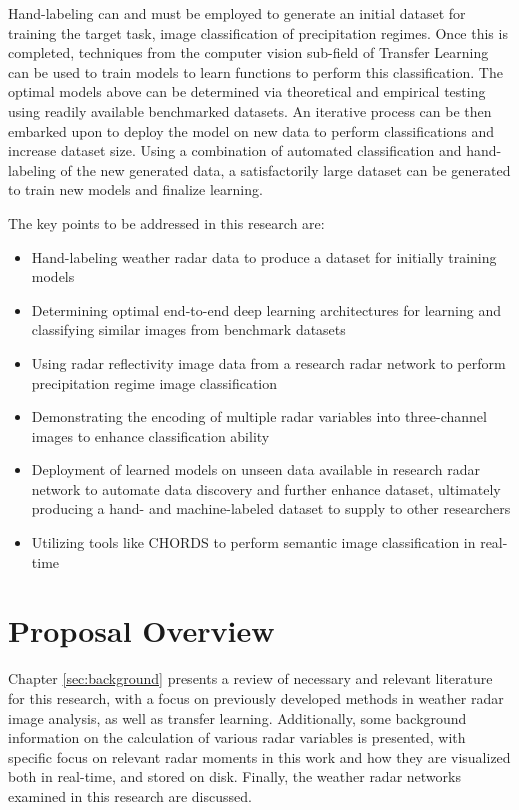 Hand-labeling can and must be employed to generate an initial dataset for training the target task, image classification of precipitation regimes.
Once this is completed, techniques from the computer vision sub-field of Transfer Learning can be used to train models to learn functions to perform this classification.
The optimal models above can be determined via theoretical and empirical testing using readily available benchmarked datasets.
An iterative process can be then embarked upon to deploy the model on new data to perform classifications and increase dataset size.
Using a combination of automated classification and hand-labeling of the new generated data, a satisfactorily large dataset can be generated to train new models and finalize learning.

The key points to be addressed in this research are:
\begin{itemize}
	\item Hand-labeling weather radar data to produce a dataset for initially training models
	\item Determining optimal end-to-end deep learning architectures for learning and classifying similar images from benchmark datasets
	\item Using radar reflectivity image data from a research radar network to perform precipitation regime image classification
	\item Demonstrating the encoding of multiple radar variables into three-channel images to enhance classification ability
	\item Deployment of learned models on unseen data available in research radar network to automate data discovery and further enhance dataset, ultimately producing a hand- and machine-labeled dataset to supply to other researchers
	\item Utilizing tools like CHORDS to perform semantic image classification in real-time
\end{itemize}

\section{Proposal Overview}
\label{sec:introduction_overview}

Chapter \ref{sec:background} presents a review of necessary and relevant literature for this research, with a focus on previously developed methods in weather radar image analysis, as well as transfer learning. 
Additionally, some background information on the calculation of various radar variables is presented, with specific focus on relevant radar moments in this work and how they are visualized both in real-time, and stored on disk.
Finally, the weather radar networks examined in this research are discussed.

